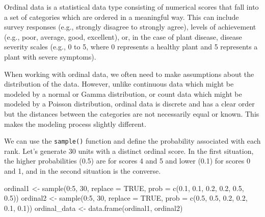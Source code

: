 \documentclass[
  letterpaper,
]{book}
\newenvironment{Shaded}{\begin{snugshade}}{\end{snugshade}}
\newcommand{\AttributeTok}[1]{\textcolor[rgb]{0.40,0.45,0.13}{#1}}
\newcommand{\ConstantTok}[1]{\textcolor[rgb]{0.56,0.35,0.01}{#1}}
\newcommand{\DecValTok}[1]{\textcolor[rgb]{0.68,0.00,0.00}{#1}}
\newcommand{\FloatTok}[1]{\textcolor[rgb]{0.68,0.00,0.00}{#1}}
\newcommand{\FunctionTok}[1]{\textcolor[rgb]{0.28,0.35,0.67}{#1}}
\newcommand{\NormalTok}[1]{\textcolor[rgb]{0.00,0.23,0.31}{#1}}
\newcommand{\OtherTok}[1]{\textcolor[rgb]{0.00,0.23,0.31}{#1}}
\newcommand{\SpecialCharTok}[1]{\textcolor[rgb]{0.37,0.37,0.37}{#1}}
\begin{document}
Ordinal data is a statistical data type consisting of numerical scores
that fall into a set of categories which are ordered in a meaningful
way. This can include survey responses (e.g., strongly disagree to
strongly agree), levels of achievement (e.g., poor, average, good,
excellent), or, in the case of plant disease, disease severity scales
(e.g., 0 to 5, where 0 represents a healthy plant and 5 represents a
plant with severe symptoms).

When working with ordinal data, we often need to make assumptions about
the distribution of the data. However, unlike continuous data which
might be modeled by a normal or Gamma distribution, or count data which
might be modeled by a Poisson distribution, ordinal data is discrete and
has a clear order but the distances between the categories are not
necessarily equal or known. This makes the modeling process slightly
different.

We can use the \texttt{sample()} function and define the probability
associated with each rank. Let's generate 30 units with a distinct
ordinal score. In the first situation, the higher probabilities (0.5)
are for scores 4 and 5 and lower (0.1) for scores 0 and 1, and in the
second situation is the converse.

\begin{Shaded}
\begin{Highlighting}[]
\NormalTok{ordinal1 }\OtherTok{\textless{}{-}} \FunctionTok{sample}\NormalTok{(}\DecValTok{0}\SpecialCharTok{:}\DecValTok{5}\NormalTok{, }\DecValTok{30}\NormalTok{, }\AttributeTok{replace =} \ConstantTok{TRUE}\NormalTok{, }\AttributeTok{prob =} \FunctionTok{c}\NormalTok{(}\FloatTok{0.1}\NormalTok{, }\FloatTok{0.1}\NormalTok{, }\FloatTok{0.2}\NormalTok{, }\FloatTok{0.2}\NormalTok{, }\FloatTok{0.5}\NormalTok{, }\FloatTok{0.5}\NormalTok{))}
\NormalTok{ordinal2 }\OtherTok{\textless{}{-}} \FunctionTok{sample}\NormalTok{(}\DecValTok{0}\SpecialCharTok{:}\DecValTok{5}\NormalTok{, }\DecValTok{30}\NormalTok{, }\AttributeTok{replace =} \ConstantTok{TRUE}\NormalTok{, }\AttributeTok{prob =} \FunctionTok{c}\NormalTok{(}\FloatTok{0.5}\NormalTok{, }\FloatTok{0.5}\NormalTok{, }\FloatTok{0.2}\NormalTok{, }\FloatTok{0.2}\NormalTok{, }\FloatTok{0.1}\NormalTok{, }\FloatTok{0.1}\NormalTok{))}
\NormalTok{ordinal\_data }\OtherTok{\textless{}{-}} \FunctionTok{data.frame}\NormalTok{(ordinal1, ordinal2)}
\end{Highlighting}
\end{Shaded}
\end{document}

